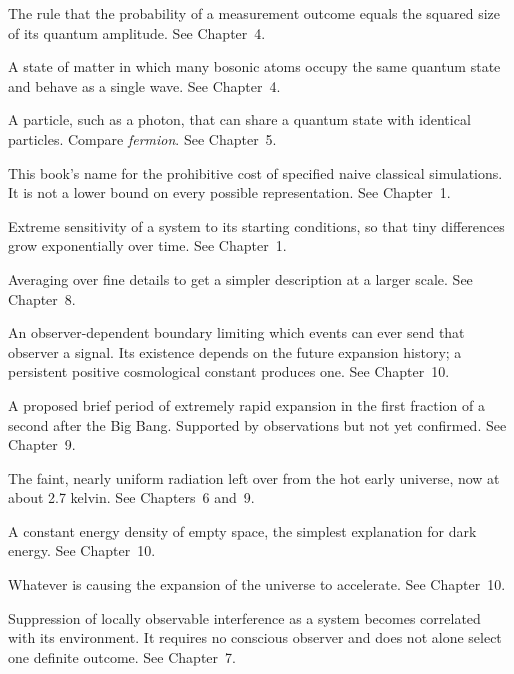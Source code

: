\begin{description}[
    style=nextline,
    leftmargin=2.2em,
    labelwidth=2em,
    labelsep=0.4em,
    itemsep=0.65em,
    parsep=0pt,
    topsep=0.25em
]
\item[Born rule] The rule that the probability of a measurement outcome equals the squared size of its quantum amplitude. See Chapter~4.

\item[Bose--Einstein condensate] A state of matter in which many bosonic atoms occupy the same quantum state and behave as a single wave. See Chapter~4.

\item[Boson] A particle, such as a photon, that can share a quantum state with identical particles. Compare \emph{fermion}. See Chapter~5.

\item[Brute-force wall] This book's name for the prohibitive cost of specified naive classical simulations. It is not a lower bound on every possible representation. See Chapter~1.

\item[Chaos] Extreme sensitivity of a system to its starting conditions, so that tiny differences grow exponentially over time. See Chapter~1.

\item[Coarse-graining] Averaging over fine details to get a simpler description at a larger scale. See Chapter~8.

\item[Cosmic event horizon] An observer-dependent boundary limiting which events can ever send that observer a signal. Its existence depends on the future expansion history; a persistent positive cosmological constant produces one. See Chapter~10.

\item[Cosmic inflation] A proposed brief period of extremely rapid expansion in the first fraction of a second after the Big Bang. Supported by observations but not yet confirmed. See Chapter~9.

\item[Cosmic microwave background] The faint, nearly uniform radiation left over from the hot early universe, now at about 2.7 kelvin. See Chapters~6 and~9.

\item[Cosmological constant] A constant energy density of empty space, the simplest explanation for dark energy. See Chapter~10.

\item[Dark energy] Whatever is causing the expansion of the universe to accelerate. See Chapter~10.

\item[Decoherence] Suppression of locally observable interference as a system becomes correlated with its environment. It requires no conscious observer and does not alone select one definite outcome. See Chapter~7.


\end{description}
